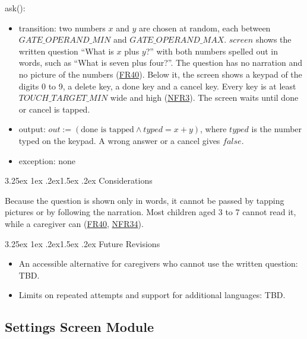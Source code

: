 \documentclass[10pt, titlepage]{article}
\makeatletter
\newcommand{\srsurl}{https://team-hindsight.github.io/ophthamology-game/SRS/SRS.pdf}
\newcommand{\srsitemref}[2]{\href{\srsurl\#nameddest=#1}{#2}}
\renewcommand\paragraph{\@startsection{paragraph}{4}{\z@}%
  {3.25ex \@plus 1ex \@minus .2ex}{1.5ex \@plus .2ex}%
  {\normalfont\normalsize\bfseries}}
\newcommand{\T}[1]{\mathit{#1}}          %
\newcommand{\out}{\mathit{out}}
\newcommand{\false}{\mathit{false}}
\makeatother
\begin{document}
\begin{samepage}
\noindent ask():
\begin{itemize}
\item transition: two numbers $x$ and $y$ are chosen at random, each between
  $\T{GATE\_OPERAND\_MIN}$ and $\T{GATE\_OPERAND\_MAX}$. $\T{screen}$ shows the
  written question ``What is $x$ plus $y$?'' with both numbers spelled out in
  words, such as ``What is seven plus four?''. The question has no narration
  and no picture of the numbers (\srsitemref{FR_ParentGate}{FR40}). Below it,
  the screen shows a keypad of the digits 0 to 9, a delete key, a done key and
  a cancel key. Every key is at least $\T{TOUCH\_TARGET\_MIN}$ wide and high
  (\srsitemref{NFR_TouchTarget}{NFR3}). The screen waits until done or cancel
  is tapped.
\item output: $\out := (\text{done is tapped} \wedge \T{typed} = x + y)$,
  where $\T{typed}$ is the number typed on the keypad. A wrong answer or a
  cancel gives $\false$.
\item exception: none
\end{itemize}
\end{samepage}
\par\pagebreak[0]

\paragraph{Considerations}

Because the question is shown only in words, it cannot be passed by tapping
pictures or by following the narration. Most children aged 3 to 7 cannot read
it, while a caregiver can (\srsitemref{FR_ParentGate}{FR40},
\srsitemref{NFR_StoreCompliance}{NFR34}).

\paragraph{Future Revisions}

\begin{itemize}
\item An accessible alternative for caregivers who cannot use the written question: TBD.
\item Limits on repeated attempts and support for additional languages: TBD.
\end{itemize}

\newpage
\subsection{Settings Screen Module} \label{mis:Settings}
\end{document}
